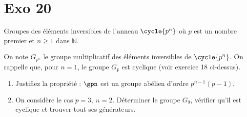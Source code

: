 
\section*{Exo 20} Groupes des éléments inversibles de l'anneau $\cycle{p^n}$ où $p$ est un nombre premier et $n \geq 1$ dans $\mathbb{N}$.


On note $G_{p^n}$ le groupe multiplicatif des éléments inversibles de $\cycle{p^n}$. On rappelle que, pour $n=1$, le groupe $G_p$ est cyclique (voir exercice 18 ci-dessus). 


\begin{enumerate}
   \item Justifiez la propriété : $\gpn$ est un groupe abélien d'ordre $p^{n-1}(p-1)$.
   \item On considère le cas $p=3,\ n=2$. Déterminer le groupe $G_9$, vérifier qu'il est cyclique et trouver tout ses générateurs. 


\end{enumerate}
